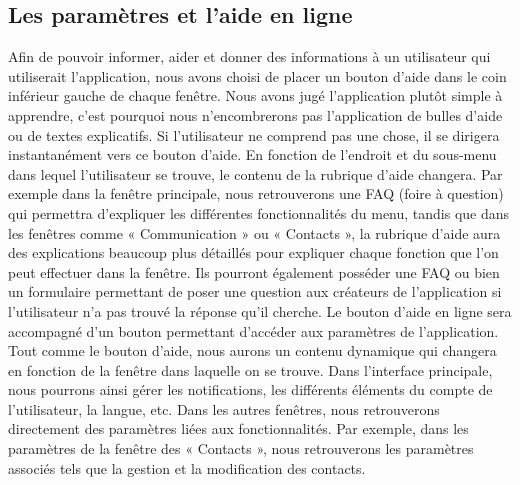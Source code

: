 \documentclass[11pt]{article}
\begin{document}
\subsection{Les paramètres et l'aide en ligne}\label{par:aide}
Afin de pouvoir informer, aider et donner des informations à un utilisateur qui utiliserait l’application, nous avons choisi de placer un bouton d’aide dans le coin inférieur gauche de chaque fenêtre. Nous avons jugé l’application plutôt simple à apprendre, c’est pourquoi nous n’encombrerons pas l’application de bulles d’aide ou de textes explicatifs. Si l’utilisateur ne comprend pas une chose, il se dirigera instantanément vers ce bouton d’aide. En fonction de l’endroit et du sous-menu dans lequel l’utilisateur se trouve, le contenu de la rubrique d’aide changera. Par exemple dans la fenêtre principale, nous retrouverons une FAQ (foire à question) qui permettra d’expliquer les différentes fonctionnalités du menu, tandis que dans les fenêtres comme « Communication » ou « Contacts », la rubrique d’aide aura des explications beaucoup plus détaillés pour expliquer chaque fonction que l’on peut effectuer dans la fenêtre. Ils pourront également posséder une FAQ ou bien un formulaire permettant de poser une question aux créateurs de l’application si l’utilisateur n’a pas trouvé la réponse qu’il cherche.
Le bouton d’aide en ligne sera accompagné d’un bouton permettant d’accéder aux paramètres de l’application. Tout comme le bouton d’aide, nous aurons un contenu dynamique qui changera en fonction de la fenêtre dans laquelle on se trouve. Dans l’interface principale, nous pourrons ainsi gérer les notifications, les différents éléments du compte de l’utilisateur, la langue, etc. Dans les autres fenêtres, nous retrouverons directement des paramètres liées aux fonctionnalités. Par exemple, dans les paramètres de la fenêtre des « Contacts », nous retrouverons les paramètres associés tels que la gestion et la modification des contacts.

\newpage
\end{document}
